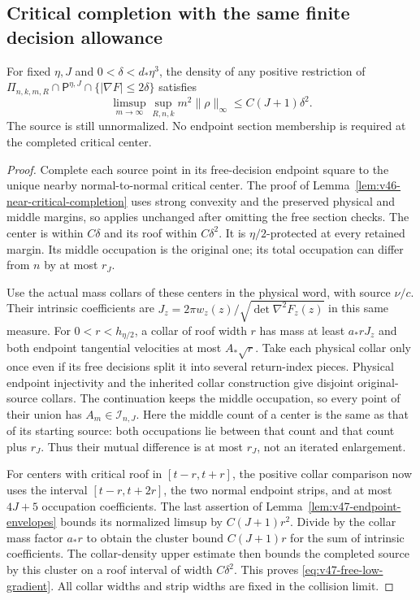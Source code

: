 \subsection{Critical completion with the same finite decision allowance}
\begin{lemma}
\label{lem:v47-free-critical-cluster}
For fixed $\eta,J$ and $0<\delta<d_*\eta^3$, the density of any
positive restriction of
$\Pi_{n,k,m,R}\cap\mathsf P^{\eta,J}\cap\{|\nabla F|\le2\delta\}$
satisfies
\begin{equation}\label{eq:v47-free-low-gradient}
 \limsup_{m\to\infty}\sup_{R,n,k}m^2\|\rho\|_\infty
                                      \le C(J+1)\delta^2.
\end{equation}
The source is still unnormalized. No endpoint section membership is
required at the completed critical center.
\end{lemma}
\begin{proof}
Complete each source point in its free-decision endpoint square to
the unique nearby normal-to-normal critical center. The proof of
Lemma~\ref{lem:v46-near-critical-completion} uses strong convexity
and the preserved physical and middle margins, so applies unchanged
after omitting the free section checks. The center is within
$C\delta$ and its roof within $C\delta^2$. It is
$\eta/2$-protected at every retained margin. Its middle occupation
is the original one; its total occupation can differ from $n$ by
at most $r_J$.

Use the actual mass collars of these centers in the physical word,
with source $\nu/c$. Their intrinsic coefficients are
$J_z=2\pi w_z(z)/\sqrt{\det\nabla^2F_z(z)}$ in this same measure.
For $0<r<h_{\eta/2}$, a collar of roof width $r$ has mass at least
$a_*rJ_z$ and both endpoint tangential velocities at most $A_*\sqrt r$.
Take each physical collar only once even if its free decisions split
it into several return-index pieces. Physical endpoint injectivity
and the inherited collar construction give disjoint original-source
collars. The continuation keeps the middle occupation, so every point
of their union has $A_m\in\mathcal I_{n,J}$. Here the middle count of
a center is the same as that of its starting source: both occupations
lie between that count and that count plus $r_J$. Thus their mutual
difference is at most $r_J$, not an iterated enlargement.

For centers with critical roof in $[t-r,t+r]$, the positive collar
comparison now uses the interval $[t-r,t+2r]$, the two normal endpoint
strips, and at most $4J+5$ occupation coefficients. The last assertion
of Lemma~\ref{lem:v47-endpoint-envelopes} bounds its normalized
limsup by $C(J+1)r^2$. Divide by the collar mass factor $a_*r$ to
obtain the cluster bound $C(J+1)r$ for the sum of intrinsic coefficients.
The collar-density upper estimate then bounds the completed source
by this cluster on a roof interval of width $C\delta^2$.
This proves \eqref{eq:v47-free-low-gradient}. All collar widths and
strip widths are fixed in the collision limit.
\end{proof}

